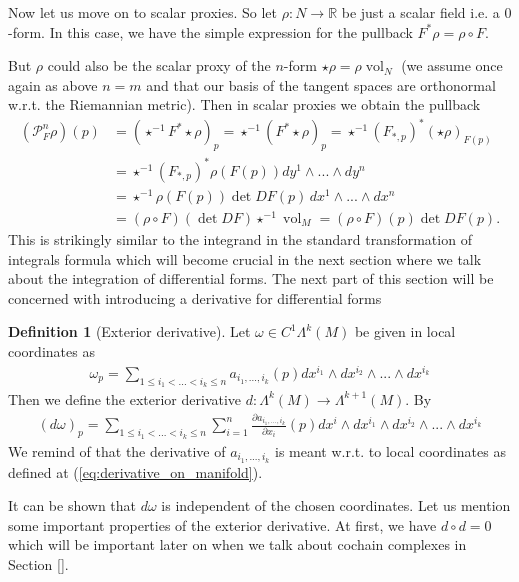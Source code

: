 \documentclass[12pt,a4paper]{article}
\numberwithin{equation}{subsection}
\numberwithin{lemma}{subsection}
\theoremstyle{definition}
\newtheorem{definition}[lemma]{Definition}
\DeclareMathOperator{\vol}{vol}
\newcommand{\real}{\mathbb{R}}
\begin{document}
Now let us move on to scalar proxies. So let $\rho: N \rightarrow \real$ be 
just a scalar field i.e. a $0$-form. In this case, we 
have the simple expression for the pullback $F^* \rho = \rho \circ F$. 

But $\rho$ could also be the scalar proxy of the $n$-form 
$\star \rho = \rho \vol_N$ (we assume once again 
as above
$n=m$ and that our basis of the tangent spaces are orthonormal w.r.t. the 
Riemannian metric). Then in scalar proxies we obtain the pullback
\begin{align*}
    (\mathcal{P}_F^n \rho )(p) 
    &= (\star ^{-1}F^* \star \rho)_p
    = \star ^{-1} (F^* \star \rho)_p
    = \star ^{-1} (F_{*,p})^* (\star \rho)_{F(p)}
    \\ &= \star ^{-1} (F_{*,p})^* \rho(F(p)) dy^1 \wedge ... \wedge dy^n
    \\ &= \star ^{-1} \rho(F(p)) \det DF(p) \, dx^1 \wedge ... \wedge dx^n
    \\ &=  (\rho \circ F) (\det DF) \star^{-1}\vol_M
    = (\rho \circ F)(p) \det DF(p).
\end{align*}
This is strikingly similar to the integrand in the standard transformation 
of integrals formula which will become crucial in the next section
where we talk about the
integration of differential forms. The next part of this section will be 
concerned with introducing a derivative for differential forms

\begin{definition}[Exterior derivative]
    Let $\omega \in C^1\Lambda^k (M)$ be given in local coordinates as
    \begin{align*}
        \omega_p = \sum\limits_{1\leq i_1 < ... < i_k \leq n} 
            a_{i_1,...,i_k}(p) dx^{i_1} \wedge dx^{i_2} \wedge ... \wedge dx^{i_k}
    \end{align*}
    Then we define the exterior derivative $d: \Lambda^{k}(M) \rightarrow 
    \Lambda^{k+1}(M)$. By
    \begin{align*}
        (d\omega)_p = \sum\limits_{1\leq i_1 < ... < i_k \leq n} \sum\limits_{i=1}^n
        \frac{\partial a_{i_1,...,i_k}}{\partial x_i}(p) 
        dx^i \wedge dx^{i_1} \wedge dx^{i_2} \wedge ... \wedge dx^{i_k}
    \end{align*}
    We remind of that the derivative of $a_{i_1,...,i_k}$ is meant w.r.t. 
    to local coordinates as defined at (\ref{eq:derivative_on_manifold}).
\end{definition}
It can be shown that $d\omega$ is independent of the chosen coordinates. 
Let us mention some important properties of the exterior derivative. 
At first, we have $d\circ d = 0$ which will be important later on 
when we talk about cochain complexes in Section \ref{}. 
\end{document}
